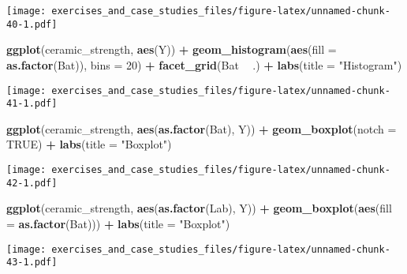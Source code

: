 \documentclass[]{book}
\newenvironment{Shaded}{\begin{snugshade}}{\end{snugshade}}
\newcommand{\DataTypeTok}[1]{\textcolor[rgb]{0.13,0.29,0.53}{#1}}
\newcommand{\DecValTok}[1]{\textcolor[rgb]{0.00,0.00,0.81}{#1}}
\newcommand{\KeywordTok}[1]{\textcolor[rgb]{0.13,0.29,0.53}{\textbf{#1}}}
\newcommand{\NormalTok}[1]{#1}
\newcommand{\OperatorTok}[1]{\textcolor[rgb]{0.81,0.36,0.00}{\textbf{#1}}}
\newcommand{\OtherTok}[1]{\textcolor[rgb]{0.56,0.35,0.01}{#1}}
\newcommand{\StringTok}[1]{\textcolor[rgb]{0.31,0.60,0.02}{#1}}
\theoremstyle{definition}
\theoremstyle{definition}
\theoremstyle{definition}
\theoremstyle{remark}
\begin{document}
\texttt{[image: exercises\_and\_case\_studies\_files/figure-latex/unnamed-chunk-40-1.pdf]}

\begin{Shaded}
\begin{Highlighting}[]
\KeywordTok{ggplot}\NormalTok{(ceramic_strength, }\KeywordTok{aes}\NormalTok{(Y)) }\OperatorTok{+}
\StringTok{  }\KeywordTok{geom_histogram}\NormalTok{(}\KeywordTok{aes}\NormalTok{(}\DataTypeTok{fill =} \KeywordTok{as.factor}\NormalTok{(Bat)), }\DataTypeTok{bins =} \DecValTok{20}\NormalTok{) }\OperatorTok{+}
\StringTok{  }\KeywordTok{facet_grid}\NormalTok{(Bat }\OperatorTok{~}\StringTok{ }\NormalTok{.) }\OperatorTok{+}
\StringTok{  }\KeywordTok{labs}\NormalTok{(}\DataTypeTok{title =} \StringTok{"Histogram"}\NormalTok{)}
\end{Highlighting}
\end{Shaded}

\texttt{[image: exercises\_and\_case\_studies\_files/figure-latex/unnamed-chunk-41-1.pdf]}

\begin{Shaded}
\begin{Highlighting}[]
\KeywordTok{ggplot}\NormalTok{(ceramic_strength, }\KeywordTok{aes}\NormalTok{(}\KeywordTok{as.factor}\NormalTok{(Bat), Y)) }\OperatorTok{+}
\StringTok{  }\KeywordTok{geom_boxplot}\NormalTok{(}\DataTypeTok{notch =} \OtherTok{TRUE}\NormalTok{) }\OperatorTok{+}
\StringTok{  }\KeywordTok{labs}\NormalTok{(}\DataTypeTok{title =} \StringTok{"Boxplot"}\NormalTok{)}
\end{Highlighting}
\end{Shaded}

\texttt{[image: exercises\_and\_case\_studies\_files/figure-latex/unnamed-chunk-42-1.pdf]}

\begin{Shaded}
\begin{Highlighting}[]
\KeywordTok{ggplot}\NormalTok{(ceramic_strength, }\KeywordTok{aes}\NormalTok{(}\KeywordTok{as.factor}\NormalTok{(Lab), Y)) }\OperatorTok{+}
\StringTok{  }\KeywordTok{geom_boxplot}\NormalTok{(}\KeywordTok{aes}\NormalTok{(}\DataTypeTok{fill =} \KeywordTok{as.factor}\NormalTok{(Bat))) }\OperatorTok{+}
\StringTok{  }\KeywordTok{labs}\NormalTok{(}\DataTypeTok{title =} \StringTok{"Boxplot"}\NormalTok{)}
\end{Highlighting}
\end{Shaded}

\texttt{[image: exercises\_and\_case\_studies\_files/figure-latex/unnamed-chunk-43-1.pdf]}
\end{document}

